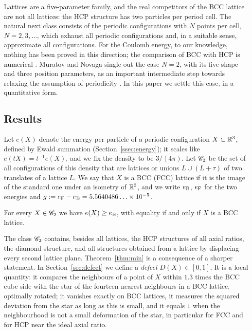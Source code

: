 Lattices are a five-parameter family, and the real competitors of the BCC lattice are not all lattices: the HCP structure has two
particles per period cell. The natural next class consists of the periodic configurations with $N$ points per cell, $N=2,3,\dots$,
which exhaust all periodic configurations and, in a suitable sense, approximate all configurations. For the Coulomb energy, to our
knowledge, nothing has been proved in this direction; the comparison of BCC with HCP is numerical
\cite{Foldy1978,BaikoPotekhinYakovlev2001,BeterminSamajTravenec2023}. Muratov and Novaga single out the case $N=2$, with its five
shape and three position parameters, as an important intermediate step towards relaxing the assumption of periodicity
\cite[Section~7]{MuratovNovaga2026}. In this paper we settle this case, in a quantitative form.

\subsection{Results}

Let $e(X)$ denote the energy per particle of a periodic configuration $X\subset\mathbb R^3$, defined by Ewald summation
(Section~\ref{ssec:energy}); it scales like $e(tX)=t^{-1}e(X)$, and we fix the density to be $3/(4\pi)$. Let $\mathscr C_2$ be the set of
all configurations of this density that are lattices or unions $L\cup(L+\tau)$ of two translates of a lattice $L$. We say that $X$ is a
BCC (FCC) lattice if it is the image of the standard one under an isometry of $\mathbb R^3$, and we write $e_{\mathrm B}$, $e_{\mathrm F}$ for the two energies
and $g:=e_{\mathrm F}-e_{\mathrm B}=5.5640486\ldots\times10^{-5}$.

\begin{theorem}[Optimality]\label{thm:min}
For every $X\in\mathscr C_2$ we have $e(X)\ge e_{\mathrm B}$, with equality if and only if $X$ is a BCC lattice.
\end{theorem}

The class $\mathscr C_2$ contains, besides all lattices, the HCP structures of all axial ratios, the diamond structure, and all structures
obtained from a lattice by displacing every second lattice plane. Theorem~\ref{thm:min} is a consequence of a sharper statement. In
Section~\ref{sec:defect} we define a \emph{defect} $D(X)\in[0,1]$. It is a local quantity: it compares the neighbours of a point of
$X$ within $1.3$ times the BCC cube side with the star of the fourteen nearest neighbours in a BCC lattice, optimally rotated; it
vanishes exactly on BCC lattices, it measures the squared deviation from the star as long as this is small, and it equals $1$ when
the neighbourhood is not a small deformation of the star, in particular for FCC and for HCP near the ideal axial ratio.

